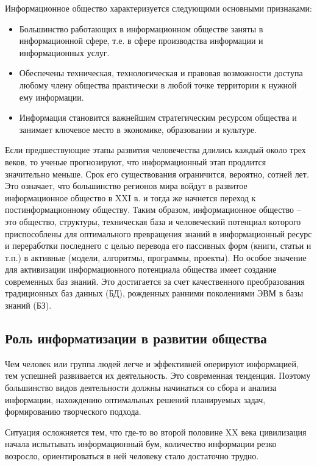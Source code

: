 Информационное общество характеризуется следующими основными признаками:
\begin{itemize}
\item Большинство работающих в информационном обществе заняты в информационной сфере, т.е. в сфере производства информации и информационных услуг.

\item Обеспечены техническая, технологическая и правовая возможности доступа любому члену общества практически в любой точке территории к нужной ему информации.

\item Информация становится важнейшим стратегическим ресурсом общества и занимает ключевое место в экономике, образовании и культуре.
\end{itemize}
Если предшествующие этапы развития человечества длились каждый около трех веков, то ученые прогнозируют, что информационный этап продлится значительно меньше. Срок его существования ограничится, вероятно, сотней лет. Это означает, что большинство регионов мира войдут в развитое информационное общество в XXI в. и тогда же начнется переход к постинформационному обществу.
Таким образом, информационное общество – это общество, структуры, техническая база и человеческий потенциал которого приспособлены для оптимального превращения знаний в информационный ресурс и переработки последнего с целью перевода его пассивных форм (книги, статьи и т.п.) в активные (модели, алгоритмы, программы, проекты). Но особое значение для активизации информационного потенциала общества имеет создание современных баз знаний. Это достигается за счет качественного преобразования традиционных баз данных (БД), рожденных ранними поколениями ЭВМ в базы знаний (БЗ).

\newpage
\subsection{Роль информатизации в развитии общества} \label{subsect2_3_2}

Чем человек или группа людей легче и эффективней оперируют информацией, тем успешней развивается их деятельность. Это современная тенденция. Поэтому большинство видов деятельности должны начинаться со сбора и анализа информации, нахождению оптимальных решений планируемых задач, формированию творческого подхода.

Ситуация осложняется тем, что где-то во второй половине XX века цивилизация начала испытывать информационный бум, количество информации резко возросло, ориентироваться в ней человеку стало достаточно трудно.

